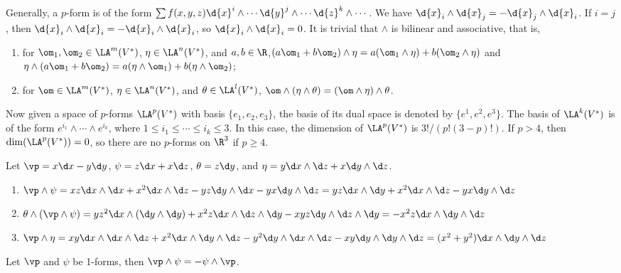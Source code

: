 \documentclass[10pt]{article}
\begin{document}
\par
Generally, a $p$-form is of the form $\sum f(x,y,z)\d{x}^{i}\wedge\cdots\d{y}^{j}\wedge\cdots\d{z}^{k}\wedge\cdots$. We have $\d{x}_{i}\wedge\d{x}_{j}=-\d{x}_{j}\wedge\d{x}_{i}$. If $i=j$, then $\d{x}_{i}\wedge\d{x}_{i}=-\d{x}_{i}\wedge\d{x}_{i}$, so $\d{x}_{i}\wedge\d{x}_{i}=0$. It is trivial that $\wedge$ is bilinear and associative, that is,
\begin{enumerate}
    \item for ${\om}_{1},{\om}_{2}\in{\LA}^{m}({V}^{*})$, $\eta\in{\LA}^{n}({V}^{*})$, and $a,b\in\R$,$(a{\om}_{1}+b{\om}_{2})\wedge\eta=a({\om}_{1}\wedge\eta)+b({\om}_{2}\wedge\eta)$ and $\eta\wedge(a{\om}_{1}+b{\om}_{2})=a(\eta\wedge{\om}_{1})+b(\eta\wedge{\om}_{2})$;
    \item for $\om\in{\LA}^{m}({V}^{*})$, $\eta\in{\LA}^{n}({V}^{*})$, and $\theta\in{\LA}^{l}({V}^{*})$, $\om\wedge(\eta\wedge\theta)=(\om\wedge\eta)\wedge\theta$.
\end{enumerate}
Now given a space of $p$-forms ${\LA}^{p}({V}^{*})$ with basis $\{{e}_{1},{e}_{2},{e}_{3}\}$, the basis of its dual space is denoted by $\{{e}^{1},{e}^{2},{e}^{3}\}$. The basis of ${\LA}^{k}({V}^{*})$ is of the form ${e}^{{i}_{1}}\wedge\cdots\wedge{e}^{{i}_{k}}$, where $1\le{i}_{1}\le\cdots\le{i}_{k}\le 3$. In this case, the dimension of ${\LA}^{p}({V}^{*})$ is $3!/(p!(3-p)!)$. If $p>4$, then $\dim({\LA}^{p}({V}^{*}))=0$, so there are no $p$-forms on ${\R}^{3}$ if $p\ge 4$.
\begin{example}
    Let $\vp=x\d x-y\d y$, $\psi=z\d x+x\d z$, $\theta=z\d y$, and $\eta=y\d x\wedge\d z+x\d y\wedge\d z$.
    \begin{enumerate}
        \item $\vp\wedge\psi=xz\d x\wedge\d x+{x}^{2}\d x\wedge\d z-yz\d y\wedge\d x-yx\d y\wedge\d z=yz\d x\wedge\d y+{x}^{2}\d x\wedge\d z-yx\d y\wedge\d z$
        \item $\theta\wedge(\vp\wedge\psi)=y{z}^{2}\d x\wedge(\d y\wedge\d y)+{x}^{2}z\d x\wedge\d z\wedge\d y-xyz\d y\wedge\d z\wedge\d y=-{x}^{2}z\d x\wedge\d y\wedge\d z$
        \item $\vp\wedge\eta=xy\d x\wedge\d x\wedge\d z+{x}^{2}\d x\wedge\d y\wedge\d z-{y}^{2}\d y\wedge\d x\wedge\d z-xy\d y\wedge\d y\wedge\d z=({x}^{2}+{y}^{2})\d x\wedge\d y\wedge\d z$
    \end{enumerate}
\end{example}
\begin{proposition}
    Let $\vp$ and $\psi$ be 1-forms, then $\vp\wedge\psi=-\psi\wedge\vp$.
\end{proposition}
\end{document}
